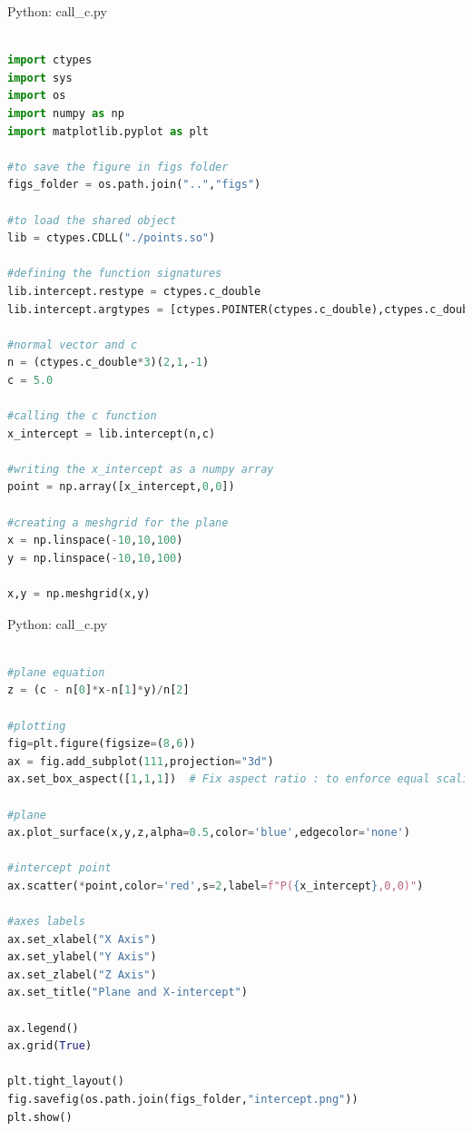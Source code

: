 \documentclass{beamer}
\numberwithin{equation}{section}
\theoremstyle{remark}
\begin{document}
\begin{frame}[fragile]{Python: call\_c.py}
\begin{lstlisting}[language=Python]

import ctypes
import sys
import os
import numpy as np 
import matplotlib.pyplot as plt 

#to save the figure in figs folder
figs_folder = os.path.join("..","figs")

#to load the shared object
lib = ctypes.CDLL("./points.so")

#defining the function signatures
lib.intercept.restype = ctypes.c_double
lib.intercept.argtypes = [ctypes.POINTER(ctypes.c_double),ctypes.c_double]

#normal vector and c 
n = (ctypes.c_double*3)(2,1,-1)
c = 5.0

#calling the c function 
x_intercept = lib.intercept(n,c)

#writing the x_intercept as a numpy array 
point = np.array([x_intercept,0,0])

#creating a meshgrid for the plane
x = np.linspace(-10,10,100)
y = np.linspace(-10,10,100)

x,y = np.meshgrid(x,y)

\end{lstlisting}
\end{frame}

\begin{frame}[fragile]{Python: call\_c.py}
\begin{lstlisting}[language=Python]

#plane equation
z = (c - n[0]*x-n[1]*y)/n[2]

#plotting
fig=plt.figure(figsize=(8,6))
ax = fig.add_subplot(111,projection="3d")
ax.set_box_aspect([1,1,1])  # Fix aspect ratio : to enforce equal scaling across axes so that xintercept lies on x axis.

#plane
ax.plot_surface(x,y,z,alpha=0.5,color='blue',edgecolor='none')

#intercept point
ax.scatter(*point,color='red',s=2,label=f"P({x_intercept},0,0)")

#axes labels 
ax.set_xlabel("X Axis")
ax.set_ylabel("Y Axis")
ax.set_zlabel("Z Axis")
ax.set_title("Plane and X-intercept")

ax.legend()
ax.grid(True)

plt.tight_layout()
fig.savefig(os.path.join(figs_folder,"intercept.png"))
plt.show()

\end{lstlisting}
\end{frame}
\end{document}

